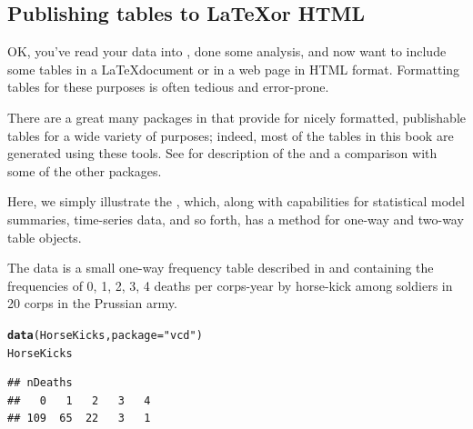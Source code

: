 \documentclass[11pt]{book}\usepackage[]{graphicx}\usepackage[]{color}
\makeatletter
\newcommand{\hlstr}[1]{\textcolor[rgb]{0.192,0.494,0.8}{#1}}%
\newcommand{\hlstd}[1]{\textcolor[rgb]{0.345,0.345,0.345}{#1}}%
\newcommand{\hlkwc}[1]{\textcolor[rgb]{0.333,0.667,0.333}{#1}}%
\newcommand{\hlkwd}[1]{\textcolor[rgb]{0.737,0.353,0.396}{\textbf{#1}}}%
\newenvironment{kframe}{%
 \def\at@end@of@kframe{}%
 \ifinner\ifhmode%
  \def\at@end@of@kframe{\end{minipage}}%
  \begin{minipage}{\columnwidth}%
 \fi\fi%
 \def\FrameCommand##1{\hskip\@totalleftmargin \hskip-\fboxsep
 \colorbox{shadecolor}{##1}\hskip-\fboxsep
     \hskip-\linewidth \hskip-\@totalleftmargin \hskip\columnwidth}%
 \MakeFramed {\advance\hsize-\width
   \@totalleftmargin\z@ \linewidth\hsize
   \@setminipage}}%
 {\par\unskip\endMakeFramed%
 \at@end@of@kframe}
\newenvironment{knitrout}{}{} %
\renewenvironment{knitrout}{\small\renewcommand{\baselinestretch}{.85}}{} %
\makeatother
\begin{document}
\subsection{Publishing tables to \LaTeX or HTML}
OK, you've read your data into \R, done some analysis, and now want to
include some tables in a \LaTeX document or in a web page in HTML format.
Formatting tables for these purposes is often tedious and error-prone.

There are a great many packages in \R that provide for nicely formatted,
publishable tables for a wide variety of purposes; indeed, most of the tables
in this book are generated using these tools.
See \citet{Leifeld:2013:JSS} for description of the 
and a comparison with some of the other packages.

Here, we simply illustrate the , which, along with
capabilities for statistical model summaries, time-series data, and
so forth, has a  method for one-way and two-way
table objects.

The  data is a small one-way frequency table 
described in  and containing the frequencies
of 0, 1, 2, 3, 4 deaths per corps-year by horse-kick among soldiers in 20 corps in
the Prussian army.
\begin{knitrout}
\color{fgcolor}\begin{kframe}
\begin{alltt}
\hlkwd{data}\hlstd{(HorseKicks,} \hlkwc{package}\hlstd{=}\hlstr{"vcd"}\hlstd{)}
\hlstd{HorseKicks}
\end{alltt}
\begin{verbatim}
## nDeaths
##   0   1   2   3   4 
## 109  65  22   3   1
\end{verbatim}
\end{kframe}
\end{knitrout}
\end{document}

